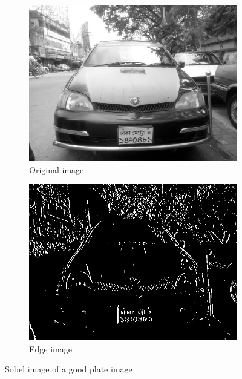 \begin{figure}
\begin{subfigure}{0.5\textwidth}
    \centering
    \includegraphics[width=0.9\linewidth]{./img/experiment/stage.2/good3}
    \caption{Original image}
\end{subfigure}
\begin{subfigure}{0.5\textwidth}
    \centering
    \includegraphics[width=0.9\linewidth]{./img/experiment/stage.3/good3}
    \caption{Edge image}
\end{subfigure}
\caption{Sobel image of a good plate image}
\label{fig:SobelResult2}
\end{figure}


